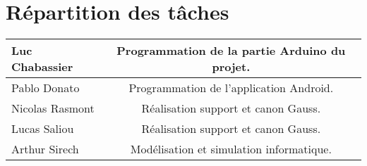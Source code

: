 \documentclass{article}
\begin{document}
\section{Répartition des tâches}
\begin{center}
	\begin{tabular}{|l|c|}
		\hline
		Luc Chabassier 	& Programmation de la partie Arduino du projet. \\
		\hline
		Pablo Donato	& Programmation de l'application Android. \\
		\hline
		Nicolas Rasmont	& Réalisation support et canon Gauss. \\
		\hline
		Lucas Saliou	& Réalisation support et canon Gauss. \\
		\hline
		Arthur Sirech	& Modélisation et simulation informatique. \\
		\hline
	\end{tabular}
\end{center}
\end{document}
